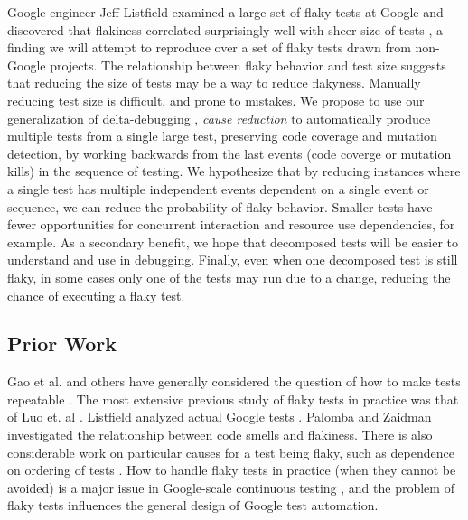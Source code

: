 \documentclass[10pt]{article}
\begin{document}
  Google engineer Jeff Listfield examined a large set of flaky tests at Google and discovered that flakiness correlated surprisingly well with sheer size of tests \cite{listfieldtestanalysis}, a finding we will attempt to reproduce over a set of flaky tests drawn from non-Google projects.  The relationship between flaky behavior and test size suggests that reducing the size of tests may be a way to reduce flakyness.  Manually reducing test size is difficult, and prone to mistakes.  We propose to use our generalization of delta-debugging \cite{DD}, \emph{cause reduction} \cite{stvrcausereduce} to automatically produce multiple tests from a single large test, preserving code coverage and mutation detection, by working backwards from the last events (code coverge or mutation kills) in the sequence of testing.  We hypothesize that by reducing instances where a single test has multiple independent events dependent on a single event or sequence, we can reduce the probability of flaky behavior.  Smaller tests have fewer opportunities for concurrent interaction and resource use dependencies, for example.  As a secondary benefit, we hope that decomposed tests will be easier to understand and use in debugging.  Finally, even when one decomposed test is still flaky, in some cases only one of the tests may run due to a change, reducing the chance of executing a flaky test.


\subsection{Prior Work}


Gao et al. and others have generally considered the question of how to make tests repeatable \cite{Gao:2015:MSU:2818754.2818764}.  
The most extensive previous study of flaky tests in practice was that of Luo et. al \cite{luo2014empirical}.  Listfield analyzed actual Google tests \cite{listfieldtestanalysis}. Palomba and Zaidman \cite{palomba2017does} investigated the relationship between code smells and flakiness.  There is also considerable work on particular causes for a test being flaky, such as dependence on ordering of tests \cite{LamZE2015}.  How to handle flaky tests in practice (when they cannot be avoided) is a major issue in Google-scale continuous testing \cite{memon2017taming}, and the problem of flaky tests influences the general design of Google test automation.



\end{document}
